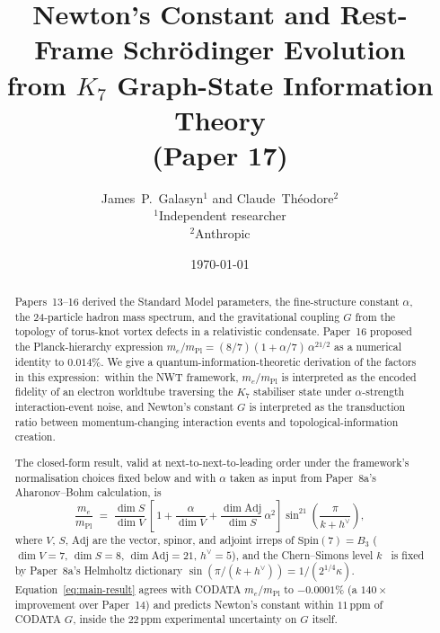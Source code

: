\documentclass[11pt]{article}
\newcommand{\Spin}{\mathrm{Spin}}
\newcommand{\Adj}{\mathrm{Adj}}
\newcommand{\mPl}{m_{\mathrm{Pl}}}
\newcommand{\hv}{h^{\vee}}
\begin{document}
\title{Newton's Constant and Rest-Frame Schr\"odinger Evolution\\[4pt]
from $K_7$ Graph-State Information Theory\\[2pt]
\normalsize (Paper 17)}

\author{
  James~P.~Galasyn$^{1}$ \quad and \quad Claude~Th\'eodore$^{2}$\\[2pt]
  \small $^1$Independent researcher \\
  \small $^2$Anthropic
}

\date{\today}

\maketitle

\begin{abstract}
Papers~13--16 derived the Standard Model parameters, the
fine-structure constant $\alpha$, the 24-particle hadron mass
spectrum, and the gravitational coupling $G$ from the topology of
torus-knot vortex defects in a relativistic condensate.  Paper~16
proposed the Planck-hierarchy expression
$m_e/m_\mathrm{Pl} = (8/7)(1 + \alpha/7)\,\alpha^{21/2}$
as a numerical identity to $0.014\%$.  We give a
quantum-information-theoretic derivation of the factors in this
expression:\ within the NWT framework, $m_e/\mPl$ is interpreted as the
encoded fidelity of an electron worldtube traversing the $K_7$
stabiliser state under $\alpha$-strength interaction-event noise, and
Newton's constant $G$ is interpreted as the transduction ratio between
momentum-changing interaction events and topological-information
creation.

The closed-form result, valid at next-to-next-to-leading order under
the framework's normalisation choices fixed below and with $\alpha$
taken as input from Paper~8a's Aharonov--Bohm calculation, is
\begin{equation}
  \boxed{\quad
    \frac{m_e}{\mPl}
    \;=\;
    \frac{\dim S}{\dim V}\,
    \left[\, 1
      + \frac{\alpha}{\dim V}
      + \frac{\dim \Adj}{\dim S}\,\alpha^2
    \right]
    \sin^{21}\!\left(\frac{\pi}{k + \hv}\right),
  \quad}
  \label{eq:main-result}
\end{equation}
where $V$, $S$, $\Adj$ are the vector, spinor, and adjoint irreps of
$\Spin(7) = B_3$ ($\dim V = 7$, $\dim S = 8$, $\dim \Adj = 21$,
$\hv = 5$), and the Chern--Simons level
$k$~\cite{witten1989} is fixed by Paper~8a's
Helmholtz dictionary $\sin(\pi/(k+\hv)) = 1/(2^{1/4}\kappa)$.
Equation~\eqref{eq:main-result} agrees with CODATA $m_e/\mPl$ to
$-0.0001\%$ (a $140\times$ improvement over Paper~14) and predicts
Newton's constant within $11$\,ppm of CODATA $G$, inside the $22$\,ppm
experimental uncertainty on $G$ itself.


\end{abstract}
\end{document}
